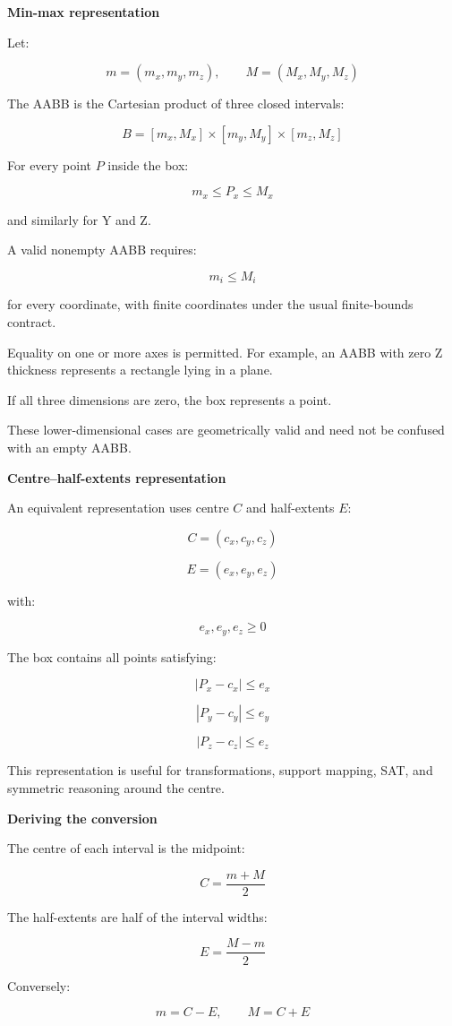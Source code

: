 \textbf{Min-max representation}

Let:

\[
m=(m_x,m_y,m_z),\qquad M=(M_x,M_y,M_z)
\]

The AABB is the Cartesian product of three closed intervals:

\[
\boxed{ B=[m_x,M_x]\times[m_y,M_y]\times[m_z,M_z] }
\]

For every point \(P\) inside the box:

\[
m_x\le P_x\le M_x
\]

and similarly for Y and Z.

A valid nonempty AABB requires:

\[
m_i\le M_i
\]

for every coordinate, with finite coordinates under the usual finite-bounds contract.

Equality on one or more axes is permitted. For example, an AABB with zero Z thickness represents a rectangle lying in a plane.

If all three dimensions are zero, the box represents a point.

These lower-dimensional cases are geometrically valid and need not be confused with an empty AABB.

\textbf{Centre--half-extents representation}

An equivalent representation uses centre \(C\) and half-extents \(E\):

\[
C=(c_x,c_y,c_z)
\]

\[
E=(e_x,e_y,e_z)
\]

with:

\[
e_x,e_y,e_z\ge0
\]

The box contains all points satisfying:

\[
|P_x-c_x|\le e_x
\]

\[
|P_y-c_y|\le e_y
\]

\[
|P_z-c_z|\le e_z
\]

This representation is useful for transformations, support mapping, SAT, and symmetric reasoning around the centre.

\textbf{Deriving the conversion}

The centre of each interval is the midpoint:

\[
\boxed{C=\frac{m+M}{2}}
\]

The half-extents are half of the interval widths:

\[
\boxed{E=\frac{M-m}{2}}
\]

Conversely:

\[
\boxed{m=C-E,\qquad M=C+E}
\]

